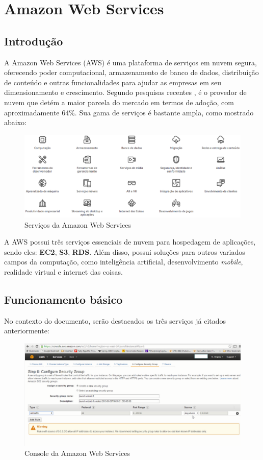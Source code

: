 \chapter{Amazon Web Services}

\section{Introdução}
A Amazon Web Services (AWS) é uma plataforma de serviços em nuvem segura, oferecendo poder computacional, armazenamento de banco de dados, distribuição de conteúdo e outras funcionalidades para ajudar as empresas em seu dimensionamento e crescimento. Segundo pesquisas recentes \cite{rightscale}, é o provedor de nuvem que detém a maior parcela do mercado em termos de adoção, com aproximadamente 64\%. Sua gama de serviços é bastante ampla, como mostrado abaixo:

\begin{figure}[h!]
  \centering
  \includegraphics[scale=0.38]{imagens/aws-services.eps}
  \caption{Serviços da Amazon Web Services\cite{aws-services}}
\end{figure}

A AWS possui três serviços essenciais de nuvem para hospedagem de aplicações, sendo eles: \textbf{EC2}, \textbf{S3}, \textbf{RDS}. Além disso, possui soluções para outros variados campos da computação, como inteligência artificial, desenvolvimento \textit{mobile}, realidade virtual e internet das coisas.


\section{Funcionamento básico}
No contexto do documento, serão destacados os três serviços já citados anteriormente:


\begin{figure}[h!]
  \centering
  \includegraphics[scale=0.42]{imagens/aws-console.eps}
  \caption{Console da Amazon Web Services}
\end{figure}


